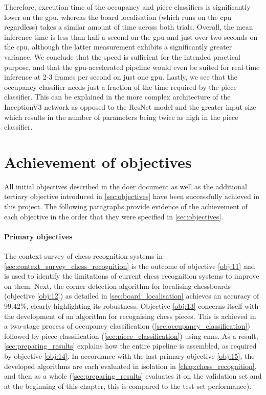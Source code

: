 \documentclass[../main.tex]{subfiles}
\begin{document}
Therefore, execution time of the occupancy and piece classifiers is significantly lower on the \gls{gpu}, whereas the board localisation (which runs on the \gls{cpu} regardless) takes a similar amount of time across both trials. 
Overall, the mean inference time is less than half a second on the \gls{gpu} and just over two seconds on the \gls{cpu}, although the latter measurement exhibits a significantly greater variance.
We conclude that the speed is sufficient for the intended practical purpose, and that the \gls{gpu}-accelerated pipeline would even be suited for real-time inference at 2-3 frames per second on just one \gls{gpu}.
Lastly, we see that the occupancy classifier needs just a fraction of the time required by the piece classifier.
This can be explained in the more complex architecture of the InceptionV3 network as opposed to the ResNet model and the greater input size which results in the number of parameters being twice as high in the piece classifier.

\section{Achievement of objectives}
\label{sec:achievement_of_objectives}
All initial objectives described in the \gls{doer} document as well as the additional tertiary objective introduced in \cref{sec:objectives} have been successfully achieved in this project.
The following paragraphs provide evidence of the achievement of each objective in the order that they were specified in \cref{sec:objectives}.

\paragraph{Primary objectives}
The context survey of chess recognition systems in \cref{sec:context_survey_chess_recognition} is the outcome of objective \ref{obj:11} and is used to identify the limitations of current chess recognition systems to improve on them.
Next, the corner detection algorithm for localising chessboards (objective \ref{obj:12}) as detailed in \cref{sec:board_localisation} achieves an accuracy of 99.42\%, clearly highlighting its robustness.
Objective \ref{obj:13} concerns itself with the development of an algorithm for recognising chess pieces.
This is achieved in a two-stage process of occupancy classification (\cref{sec:occupancy_classification}) followed by piece classification (\cref{sec:piece_classification}) using \glspl{cnn}.
As a result, \cref{sec:preparing_results} explains how the entire pipeline is assembled, as required by objective \ref{obj:14}.
In accordance with the last primary objective \ref{obj:15}, the developed algorithms are each evaluated in isolation in \cref{chap:chess_recognition}, and then as a whole (\cref{sec:preparing_results} evaluates it on the validation set and at the beginning of this chapter, this is compared to the test set performance).
\end{document}
